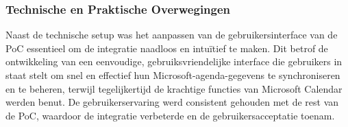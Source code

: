 \subsubsection{Technische en Praktische Overwegingen}
Naast de technische setup was het aanpassen van de gebruikersinterface van de PoC essentieel om de integratie naadloos en intuïtief te maken. Dit betrof de ontwikkeling van een eenvoudige, gebruiksvriendelijke interface die gebruikers in staat stelt om snel en effectief hun Microsoft-agenda-gegevens te synchroniseren en te beheren, terwijl tegelijkertijd de krachtige functies van Microsoft Calendar werden benut. De gebruikerservaring werd consistent gehouden met de rest van de PoC, waardoor de integratie verbeterde en de gebruikersacceptatie toenam.



